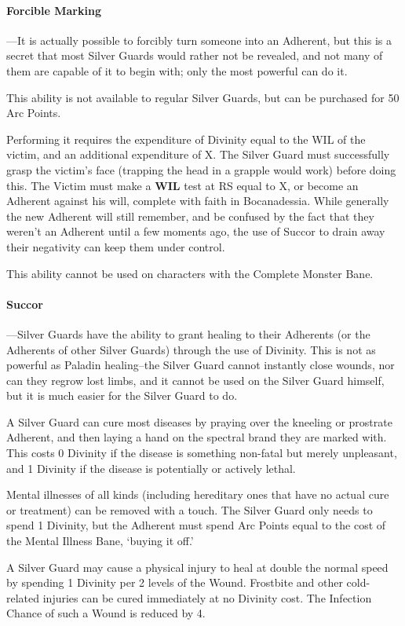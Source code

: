 \documentclass[oneside,11pt,english]{book}
\begin{document}
\paragraph{Forcible Marking}
---\quad It is actually possible to forcibly turn someone into an Adherent, but this is a secret that most 
Silver Guards would rather not be revealed, and not many of them are capable of it to begin with; 
only the most powerful can do it. 


This ability is not available to regular Silver Guards, but can be purchased for 50 Arc Points.


Performing it requires the expenditure of Divinity equal to the WIL of the victim, and an 
additional expenditure of X. The Silver Guard must successfully grasp the victim's face (trapping 
the head in a grapple would work) before doing this.
The Victim must make a \textbf{WIL} test at RS equal to X, or become an Adherent against his will, 
complete with faith in Bocanadessia. While generally the new Adherent will still remember, and 
be confused by the fact that they weren't an Adherent until a few moments ago, the use of Succor 
to drain away their negativity can keep them under control. 


This ability cannot be used on characters with the Complete Monster Bane. 
\paragraph{Succor}
---\quad Silver Guards have the ability to grant healing to their Adherents (or the Adherents of other Silver 
Guards) through the use of Divinity. This is not as powerful as Paladin healing--the Silver Guard 
cannot instantly close wounds, nor can they regrow lost limbs, and it cannot be used on the Silver 
Guard himself, but it is much easier for the Silver Guard to do. 

A Silver Guard can cure most diseases by praying over the kneeling or prostrate Adherent, and 
then laying a hand on the spectral brand they are marked with. This costs 0 Divinity if the disease 
is something non-fatal but merely unpleasant, and 1 Divinity if the disease is potentially or actively lethal. 

Mental illnesses of all kinds (including hereditary ones that have no actual cure or treatment) can 
be removed with a touch. The Silver Guard only needs to spend 1 Divinity, but the Adherent must 
spend Arc Points equal to the cost of the Mental Illness Bane, ‘buying it off.’ 


A Silver Guard may cause a physical injury to heal at double the normal speed by spending 1 
Divinity per 2 levels of the Wound. Frostbite and other cold-related injuries can be cured 
immediately at no Divinity cost. The Infection Chance of such a Wound is reduced by 4. 
\end{document}
